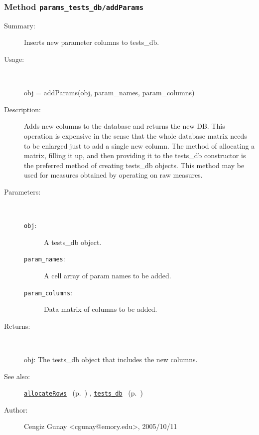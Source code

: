\subsubsection[Method \texttt{addParams}]{Method \texttt{params\_tests\_db/addParams}}%
%
\label{ref_params_tests_db__addParams}%
\hypertarget{ref_params_tests_db__addParams}{}%
\begin{description}
\item[Summary:]Inserts new parameter columns to tests\_db.
%
\item[Usage:]~%
\begin{lyxcode}%
obj = addParams(obj, param\_names, param\_columns)
%
\end{lyxcode}%
%
\item[Description:]%
Adds new columns to the database and returns the new DB.
   This operation is expensive in the sense that the whole database matrix
   needs to be enlarged just to add a 
   single new column. The method of allocating a matrix, filling it up, and
   then providing it to the tests\_db constructor is the preferred method 
   of creating tests\_db objects. This method may be used for 
   measures obtained by operating on raw measures.
\item[Parameters:]~
\begin{description}%
\item[\texttt{obj}:]
 A tests\_db object.
\item[\texttt{param\_names}:]
 A cell array of param names to be added.
\item[\texttt{param\_columns}:]
 Data matrix of columns to be added.
\end{description}%
%
\item[Returns:
]~

	obj: The tests\_db object that includes the new columns.
%
%
\item[See also:]%
\hyperlink{ref_allocateRows}{\texttt{allocateRows}}%
\ (p.~\pageref{ref_allocateRows})%
%
, \hyperlink{ref_tests_db}{\texttt{tests\_db}}%
\ (p.~\pageref{ref_tests_db})%
%
%
\item[Author:]%
Cengiz Gunay <cgunay@emory.edu>, 2005/10/11
%
\end{description}
\methodline%
